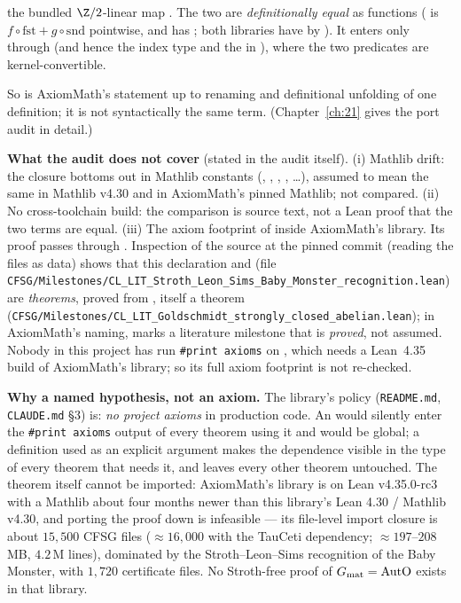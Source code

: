\begin{dictionary}
\begin{itemize}
  the bundled $\Z/2$-linear map .  The two are
  \emph{definitionally equal} as functions ( is $f\circ\mathrm{fst}+g\circ\mathrm{snd}$ pointwise,
  and  has ; both libraries have  by ).  It enters only through
   (and hence the index type  and the  in ), where the two
  predicates are kernel-convertible.
\end{itemize}
So  is AxiomMath's statement up to renaming and definitional unfolding of one definition; it is not
syntactically the same term.  (Chapter~\ref{ch:21} gives the port audit in detail.)

\textbf{What the audit does not cover} (stated in the audit itself).  (i) Mathlib drift: the closure bottoms out in Mathlib
constants (, , , ,
\dots), assumed to mean the same in Mathlib v4.30 and in AxiomMath's pinned Mathlib; not compared.  (ii) No cross-toolchain
build: the comparison is source text, not a Lean proof that the two terms are equal.  (iii) The axiom footprint of
 inside AxiomMath's library.  Its proof passes through
.  Inspection of the
source at the pinned commit (reading the files as data) shows that this declaration and
 (file \texttt{CFSG/Milestones/CL\_LIT\_Stroth\_Leon\_Sims\_Baby\_Monster\_recognition.lean})
are \emph{theorems}, proved from , itself a theorem
(\texttt{CFSG/Milestones/CL\_LIT\_Goldschmidt\_strongly\_closed\_abelian.lean}); in AxiomMath's naming,  marks a
literature milestone that is \emph{proved}, not assumed.  Nobody in this project has run \texttt{\#print axioms} on
, which needs a Lean~4.35 build of AxiomMath's library; so its full axiom footprint is not re-checked.

\textbf{Why a named hypothesis, not an axiom.}  The library's policy (\texttt{README.md}, \texttt{CLAUDE.md} \S3) is:
\emph{no project axioms} in production code.  An  would silently enter the \texttt{\#print axioms} output of
every theorem using it and would be global; a definition  used as an explicit argument
 makes the dependence visible in the type of every theorem that needs it, and leaves every other
theorem untouched.  The theorem itself cannot be imported: AxiomMath's library is on Lean v4.35.0-rc3 with a Mathlib about
four months newer than this library's Lean 4.30 / Mathlib v4.30, and porting the proof down is infeasible --- its
file-level import closure is about $15{,}500$ CFSG files ($\approx16{,}000$ with the TauCeti dependency; $\approx197$--$208$\,MB,
$4.2$\,M lines), dominated by the Stroth--Leon--Sims recognition of the Baby Monster, with $1{,}720$ certificate files.  No Stroth-free proof of $G_{\mathrm{mat}}=\mathrm{AutO}$ exists in that library.


\end{dictionary}
